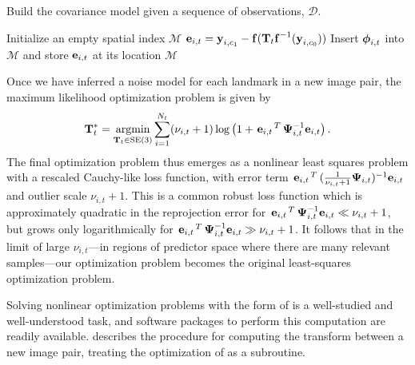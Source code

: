 \begin{algorithm}
  \caption{Build the covariance model given a sequence of observations, $\mathcal{D}$.}
  \label{alg:train-ground-truth}
  \begin{algorithmic}
      \State Initialize an empty spatial index $\mathcal{M}$
          \State $\boldsymbol{\mathbf{e}}_{i,t} = \boldsymbol{\mathbf{y}}_{i, c_1} -
            \boldsymbol{\mathbf{f}}( \boldsymbol{\mathbf{T}}_t \boldsymbol{\mathbf{f}}^{-1}(
            \boldsymbol{\mathbf{y}}_{i, c_0} ))$
            \State Insert $\boldsymbol{\mathbf{\phi}}_{i,t}$ into $\mathcal{M}$ and store
              $\boldsymbol{\mathbf{e}}_{i,t}$ at its location
        \EndFor
      \EndFor
      \State\Return $\mathcal{M}$
    \EndFunction
  \end{algorithmic}
\end{algorithm}

Once we have inferred a noise model for each landmark in a new image pair, the
maximum likelihood optimization problem is given by 
\begin{equation}
  \boldsymbol{\mathbf{T}}_t^* = \operatorname*{argmin}_{\boldsymbol{\mathbf{T}}_t\in\text{SE}(3)}\sum_{i=1}^{N_t} 
  (\nu_{i,t}+1)\log \left(1+ \left.{\boldsymbol{\mathbf{e}}_{i,t}}\right.^T
  \boldsymbol{\mathbf{\Psi}}_{i,t}^{-1} \boldsymbol{\mathbf{e}}_{i,t} \right).\label{eq:robust-loss}
\end{equation}
The final optimization problem thus emerges as a nonlinear least squares problem with a rescaled Cauchy-like loss
function, with error term $\left.{\boldsymbol{\mathbf{e}}_{i,t}}\right.^T
(\frac{1}{\nu_{i,t}+1}\boldsymbol{\mathbf{\Psi}}_{i,t})^{-1} \boldsymbol{\mathbf{e}}_{i,t}$ and outlier
scale $\nu_{i,t}+1$.  This is a common robust loss function which is
approximately quadratic in the reprojection error for
$\left.{\boldsymbol{\mathbf{e}}_{i,t}}\right.^T \boldsymbol{\mathbf{\Psi}}_{i,t}^{-1} \boldsymbol{\mathbf{e}}_{i,t} \ll
\nu_{i,t}+1$, but grows only logarithmically for $\left.{\boldsymbol{\mathbf{e}}_{i,t}}\right.^T
\boldsymbol{\mathbf{\Psi}}_{i,t}^{-1} \boldsymbol{\mathbf{e}}_{i,t} \gg \nu_{i,t}+1$.  It follows that in
the limit of large $\nu_{i,t}$---in regions of predictor space where there are
many relevant samples---our optimization problem becomes the original
least-squares optimization problem.

Solving nonlinear optimization problems with the form of  
is a well-studied and well-understood task, and software packages to
perform this computation are readily available. 
 describes the procedure for computing the transform
between a new image pair, treating the optimization of  as
a subroutine.

